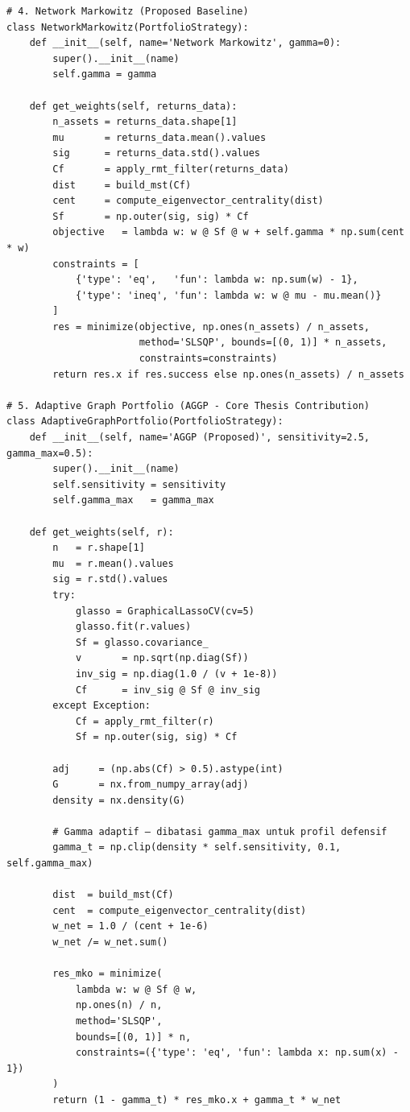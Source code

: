 \documentclass[12pt, a4paper]{article}
\begin{document}
\begin{lstlisting}
# 4. Network Markowitz (Proposed Baseline)
class NetworkMarkowitz(PortfolioStrategy):
    def __init__(self, name='Network Markowitz', gamma=0):
        super().__init__(name)
        self.gamma = gamma

    def get_weights(self, returns_data):
        n_assets = returns_data.shape[1]
        mu       = returns_data.mean().values
        sig      = returns_data.std().values
        Cf       = apply_rmt_filter(returns_data)
        dist     = build_mst(Cf)
        cent     = compute_eigenvector_centrality(dist)
        Sf       = np.outer(sig, sig) * Cf
        objective   = lambda w: w @ Sf @ w + self.gamma * np.sum(cent * w)
        constraints = [
            {'type': 'eq',   'fun': lambda w: np.sum(w) - 1},
            {'type': 'ineq', 'fun': lambda w: w @ mu - mu.mean()}
        ]
        res = minimize(objective, np.ones(n_assets) / n_assets,
                       method='SLSQP', bounds=[(0, 1)] * n_assets,
                       constraints=constraints)
        return res.x if res.success else np.ones(n_assets) / n_assets

# 5. Adaptive Graph Portfolio (AGGP - Core Thesis Contribution)
class AdaptiveGraphPortfolio(PortfolioStrategy):
    def __init__(self, name='AGGP (Proposed)', sensitivity=2.5, gamma_max=0.5):
        super().__init__(name)
        self.sensitivity = sensitivity
        self.gamma_max   = gamma_max

    def get_weights(self, r):
        n   = r.shape[1]
        mu  = r.mean().values
        sig = r.std().values
        try:
            glasso = GraphicalLassoCV(cv=5)
            glasso.fit(r.values)
            Sf = glasso.covariance_
            v       = np.sqrt(np.diag(Sf))
            inv_sig = np.diag(1.0 / (v + 1e-8))
            Cf      = inv_sig @ Sf @ inv_sig
        except Exception:
            Cf = apply_rmt_filter(r)
            Sf = np.outer(sig, sig) * Cf

        adj     = (np.abs(Cf) > 0.5).astype(int)
        G       = nx.from_numpy_array(adj)
        density = nx.density(G)

        # Gamma adaptif — dibatasi gamma_max untuk profil defensif
        gamma_t = np.clip(density * self.sensitivity, 0.1, self.gamma_max)

        dist  = build_mst(Cf)
        cent  = compute_eigenvector_centrality(dist)
        w_net = 1.0 / (cent + 1e-6)
        w_net /= w_net.sum()

        res_mko = minimize(
            lambda w: w @ Sf @ w,
            np.ones(n) / n,
            method='SLSQP',
            bounds=[(0, 1)] * n,
            constraints=({'type': 'eq', 'fun': lambda x: np.sum(x) - 1})
        )
        return (1 - gamma_t) * res_mko.x + gamma_t * w_net


\end{lstlisting}
\end{document}
